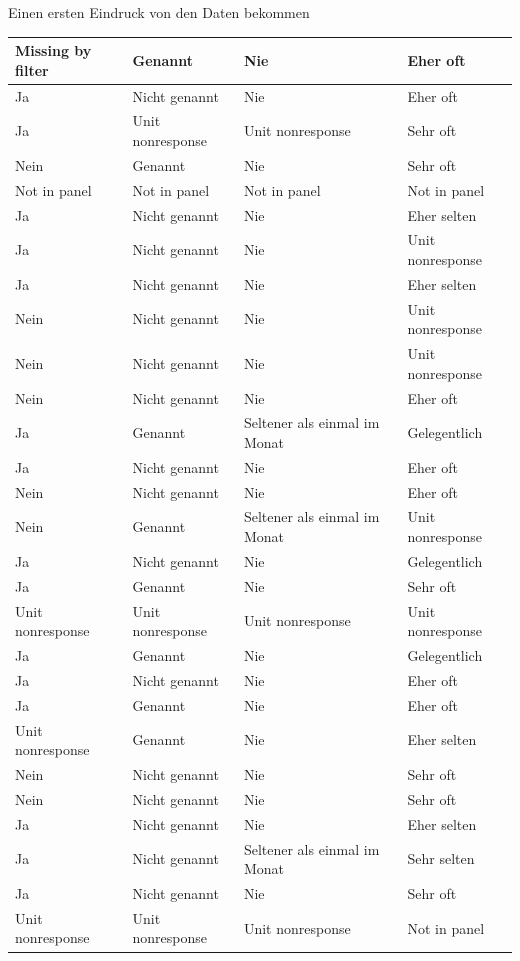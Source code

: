 \documentclass[ignorenonframetext,]{beamer}
\begin{document}
\begin{frame}{Einen ersten Eindruck von den Daten bekommen}
\begin{tabular}{l|l|l|l}
\hline
Missing by filter & Genannt & Nie & Eher oft\\
\hline
Ja & Nicht genannt & Nie & Eher oft\\
\hline
Ja & Unit nonresponse & Unit nonresponse & Sehr oft\\
\hline
Nein & Genannt & Nie & Sehr oft\\
\hline
Not in panel & Not in panel & Not in panel & Not in panel\\
\hline
Ja & Nicht genannt & Nie & Eher selten\\
\hline
Ja & Nicht genannt & Nie & Unit nonresponse\\
\hline
Ja & Nicht genannt & Nie & Eher selten\\
\hline
Nein & Nicht genannt & Nie & Unit nonresponse\\
\hline
Nein & Nicht genannt & Nie & Unit nonresponse\\
\hline
Nein & Nicht genannt & Nie & Eher oft\\
\hline
Ja & Genannt & Seltener als einmal im Monat & Gelegentlich\\
\hline
Ja & Nicht genannt & Nie & Eher oft\\
\hline
Nein & Nicht genannt & Nie & Eher oft\\
\hline
Nein & Genannt & Seltener als einmal im Monat & Unit nonresponse\\
\hline
Ja & Nicht genannt & Nie & Gelegentlich\\
\hline
Ja & Genannt & Nie & Sehr oft\\
\hline
Unit nonresponse & Unit nonresponse & Unit nonresponse & Unit nonresponse\\
\hline
Ja & Genannt & Nie & Gelegentlich\\
\hline
Ja & Nicht genannt & Nie & Eher oft\\
\hline
Ja & Genannt & Nie & Eher oft\\
\hline
Unit nonresponse & Genannt & Nie & Eher selten\\
\hline
Nein & Nicht genannt & Nie & Sehr oft\\
\hline
Nein & Nicht genannt & Nie & Sehr oft\\
\hline
Ja & Nicht genannt & Nie & Eher selten\\
\hline
Ja & Nicht genannt & Seltener als einmal im Monat & Sehr selten\\
\hline
Ja & Nicht genannt & Nie & Sehr oft\\
\hline
Unit nonresponse & Unit nonresponse & Unit nonresponse & Not in panel\\

\end{tabular}
\end{frame}
\end{document}

